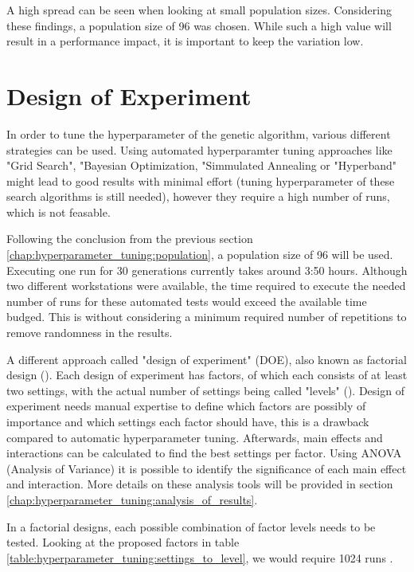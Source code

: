 A high spread can be seen when looking at small population sizes. Considering these findings, a population size of 96 was chosen. While such a high value will result in a performance impact, it is important to keep the variation low.


\section{Design of Experiment}
\label{chap:hyperparameter_tuning:other_parameter}

In order to tune the hyperparameter of the genetic algorithm, various different strategies can be used. Using automated hyperparamter tuning approaches like "Grid Search", "Bayesian Optimization, "Simmulated Annealing or "Hyperband" might lead to good results with minimal effort (tuning hyperparameter of these search algorithms is still needed), however they require a high number of runs, which is not feasable. 

Following the conclusion from the previous section \ref{chap:hyperparameter_tuning:population}, a population size of 96 will be used. Executing one run for 30 generations currently takes around 3:50 hours. Although two different workstations were available, the time required to execute the needed number of runs for these automated tests would exceed the available time budged. This is without considering a minimum required number of repetitions to remove randomness in the results.

A different approach called "design of experiment" (DOE), also known as factorial design (\cite{roy_primer_1990}). Each design of experiment has factors, of which each consists of at least two settings, with the actual number of settings being called "levels" (\cite{yang_design_2009}). Design of experiment needs manual expertise to define which factors are possibly of importance and which settings each factor should have, this is a drawback compared to automatic hyperparameter tuning. Afterwards, main effects and interactions can be calculated to find the best settings per factor. Using ANOVA (Analysis of Variance) it is possible to identify the significance of each main effect and interaction. More details on these analysis tools will be provided in section \ref{chap:hyperparameter_tuning:analysis_of_results}.

In a factorial designs, each possible combination of factor levels needs to be tested. Looking at the proposed factors in table \ref{table:hyperparameter_tuning:settings_to_level}, we would require 1024 runs .

